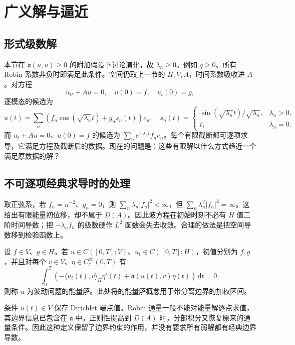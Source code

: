 \section{广义解与逼近}
\label{b2:sec:1004}

\subsection{形式级数解}
\label{b2:subsec:100401}

本节在 \(\mathfrak a(u,u)\geq0\) 的附加假设下讨论演化，故 \(\lambda_n\geq0\)。例如 \(q\geq0\)、所有 Robin 系数非负时即满足此条件。空间仍取上一节的 \(H,V,A\)，时间系数吸收进 \(A\)。对方程
\[
 u_{tt}+Au=0,
 \quad u(0)=f,
 \quad u_t(0)=g,
\]
逐模态的候选为
\begin{equation}\label{b2:eq:10-wave-series}
 u(t)=\sum_n\left(f_n\cos(\sqrt{\lambda_n}t)
 +g_n s_n(t)\right)e_n,
 \quad s_n(t)=
 \begin{cases}
 \sin(\sqrt{\lambda_n}t)/\sqrt{\lambda_n},&\lambda_n>0,\\
 t,&\lambda_n=0.
 \end{cases}
\end{equation}
而 \(u_t+Au=0\)、\(u(0)=f\) 的候选为 \(\sum_ne^{-\lambda_nt}f_ne_n\)。每个有限截断都可逐项求导，它满足方程及截断后的数据。现在的问题是：这些有限解以什么方式趋近一个满足原数据的解？

\subsection{不可逐项经典求导时的处理}
\label{b2:subsec:100402}

取正弦系，若 \(f_n=n^{-2}\)、\(g_n=0\)，则 \(\sum_n\lambda_n|f_n|^2<\infty\)，但 \(\sum_n\lambda_n^2|f_n|^2=\infty\)。这给出有限能量初位移，却不属于 \(D(A)\)。因此波方程在初始时刻不必有 \(H\) 值二阶时间导数；把 \(-\lambda_nf_n\) 的级数硬作 \(L^2\) 函数会失去收敛。合理的做法是把空间导数移到检验函数上。

\begin{definition}\label{b2:def:10-energy-wave}
设 \(f\in V\)、\(g\in H\)。若 \(u\in C([0,T];V)\)、\(u_t\in C([0,T];H)\)，初值分别为 \(f,g\)，并且对每个 \(v\in V\)、\(\eta\in C_c^\infty(0,T)\) 有
\[
 \int_0^T\left(-\langle u_t(t),v\rangle_H\eta'(t)
 +\mathfrak a(u(t),v)\eta(t)\right)\,\mathrm{d}t=0,
\]
则称 \(u\) 为波动问题的能量解。此处将的能量解概念用于带分离边界的加权区间。
\end{definition}

条件 \(u(t)\in V\) 保存 Dirichlet 端点值。Robin 通量一般不能对能量解逐点求值，其边界信息已包含在 \(\mathfrak a\) 中。正则性提高到 \(D(A)\) 时，分部积分又恢复原来的通量条件。因此这种定义保留了边界约束的作用，并没有要求所有弱解都有经典边界导数。


